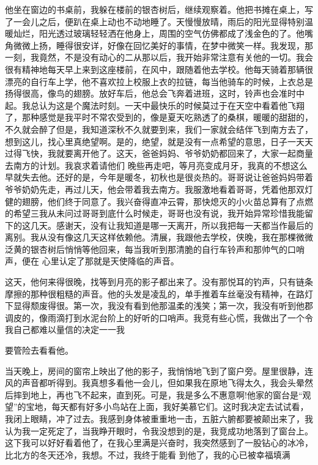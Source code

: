 \documentclass{article}
\begin{document}
他坐在窗边的书桌前，我躲在楼前的银杏树后，继续观察着。他把书摊在桌上，写了一会儿之后，便趴在桌上动也不动地睡了。天慢慢放晴，雨后的阳光显得特别温暖灿烂，阳光透过玻璃轻轻洒在他身上，周围的空气仿佛都成了浅金色的了。他嘴角微微上扬，睡得很安详，好像在回忆美好的事情，在梦中微笑一样。我发现，那一刻，我竟然，不是没有动心的二从那以后，我开始非常注意有关他的一切。我会很有精神地每天早上来到这座楼前，在风中，跟随着他去学校。他每天骑着那辆很漂亮的自行车上学，他不喜欢拉上校服上衣的拉链，每当他骑车的时候，上衣总是扬得很高，像鸟的翅膀。放好车后，他总会飞奔着进班，这时，铃声也会准时中起。我总认为这是个魔法时刻。一天中最快乐的时候莫过于在天空中看着他飞翔了，那种感觉是我平时不常农受到的，像是夏天吃熟透了的桑棋，暖暖的甜甜的，不久就会醉了但是，我知道深秋不久就要到来，我们一家就会结伴飞到南方去了，想到这儿，找心里真绝望啊。是的，绝望，就是没有一点希望的意思，日子一天天过得飞快，我就要离开他了。这天，爸爸妈妈、爷爷奶奶都回来了，大家一起商量去南方的计划。我哀求着请他们
\newpage
晚些再走吧，等月亮变成月牙，我真的不想这么早就失去他。还好的是，今年是暖冬，初秋也是很炎热的。哥哥说让爸爸妈妈带着爷爷奶奶先走，再过儿天，他会带着我去南方。我服激地看着哥哥，凭着他那双灯健的翅膀，他们终于同意了。我兴奋得直冲云霄，那快熄灭的小火苗总算有了点燃的希望三我从未问过哥哥到底什么时候走，哥哥也没有说，我开始异常珍惜我能留下的这几天。感谢天，没有让我知道是哪一天离开，所以我把每一天都当作最后的离别。我从没有像这几天这样依赖他。清展，我跟他去学校，侠晚，我在那棵微微泛黄的银杏树后悄悄等他回来，每当我听到那清脆的自行车铃声和那帅气的口哨声，便在
心里认定了那就是天使降临的声音。 

这天，他何来得很晚，找等到月亮的影子都出来了。没有那悦耳的钓声，只有链条摩擦的那种很粗糙的声音。他的头发是凌乱的，单手推着车丝毫没有精神，在路灯下显得颓废得很。第一次，我没有看到他那温柔的浅笑；第一次，我没有听到他郡调皮的，像雨滴打到水泥台阶上的好听的口哨声。我竞有些心慌，我做出了一个令我自己都难以量信的决定一一我
\newpage

要管险去看看他。 

当天晚上，房间的窗帘上映出了他的影子，我悄悄地飞到了窗户旁。屋里很静，连风的声音都听得到。我真想多看他一会儿，但如果我在原地飞得太久，我会头晕然后摔到地上，再也飞不起来，直到死。可是，我是多么不惠意啊!他家的窗台是“观望”的宝地，每天都有好多小鸟站在上面，我好美慕它们。这时我决定去试试看，我闭上眼睛，冲了过去。我感到身体被重重地一击，五脏六腑都要被颠出来了，我认为我一定死定了，当我睁开眼时，令我没想到的是，我竞成功地落到了窗台上。这下我可以好好看着他了，在我心里满是兴奋时，我突然感到了一股钻心的冰冷，比北方的冬天还冷，我想。不过，我终于能看
到他了，我的心已被幸福填满 
\end{document}
